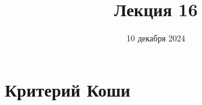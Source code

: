 \documentclass{article}
\title{Лекция 16}
\author{10 декабря 2024}
\date{}
\begin{document}
\maketitle

\section{Критерий Коши}
\end{document}
